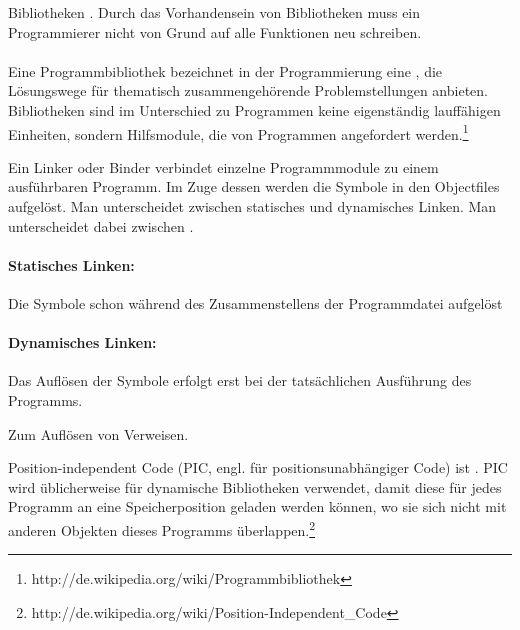\begin{answer}
Bibliotheken . Durch das Vorhandensein von Bibliotheken muss ein Programmierer nicht von Grund auf alle Funktionen neu schreiben.

\paragraph{}
Eine Programmbibliothek bezeichnet in der Programmierung eine , die Lösungswege für thematisch zusammengehörende Problemstellungen anbieten. Bibliotheken sind im Unterschied zu Programmen keine eigenständig lauffähigen Einheiten, sondern Hilfsmodule, die von Programmen angefordert werden.\footnote{http://de.wikipedia.org/wiki/Programmbibliothek}

\end{answer}

\begin{answer}
Ein Linker oder Binder verbindet einzelne Programmmodule zu einem ausführbaren Programm. Im Zuge dessen werden die Symbole in den Objectfiles aufgelöst. Man unterscheidet zwischen statisches und dynamisches Linken. Man unterscheidet dabei zwischen .

\paragraph*{Statisches Linken:}
Die Symbole schon während des Zusammenstellens der Programmdatei aufgelöst

\paragraph*{Dynamisches Linken:}
Das Auflösen der Symbole erfolgt erst bei der tatsächlichen Ausführung des Programms.
\end{answer}

\begin{answer}
Zum Auflösen von Verweisen.
\end{answer}

\begin{answer}
Position-independent Code (PIC, engl. für positionsunabhängiger Code) ist . PIC wird üblicherweise für dynamische Bibliotheken verwendet, damit diese für jedes Programm an eine Speicherposition geladen werden können, wo sie sich nicht mit anderen Objekten dieses Programms überlappen.\footnote{http://de.wikipedia.org/wiki/Position-Independent\_Code} 
\end{answer}

